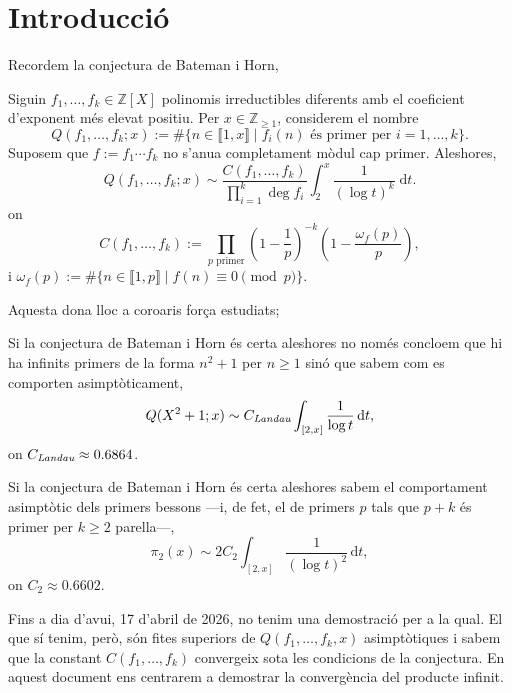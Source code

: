 \section{Introducció}

Recordem la conjectura de Bateman i Horn,
\begin{cnj}
Siguin $f_1,\ldots, f_k\in\mathbb Z[X]$ polinomis irreductibles diferents amb el coeficient d'exponent més elevat positiu. Per $x\in \mathbb Z_{\geq1}$, considerem el nombre
\[
Q(f_1,\ldots,f_k; x):=\#\{n\in \llbracket1,x\rrbracket \mid f_i(n)\text{ és primer per } i=1,\ldots,k\}.
\]
Suposem que $f:=f_1\cdots f_k$ no s'anu\lgem a completament mòdul cap primer. Aleshores,
\[
Q(f_1,\ldots,f_k;x)\sim \frac{C(f_1,\ldots, f_k)}{\prod_{i=1}^k\deg f_i}\int_2^x\frac{1}{(\log t)^k}\;\mathrm{d}t.
\]
on 
\[
C(f_1,\ldots, f_k):=\prod_{p\text{ primer}} \left(1-\frac{1}{p}\right)^{-k}\left(1-\frac{\omega_f(p)}{p}\right),
\]
i $\omega_f(p):=\#\{n\in \llbracket 1, p\rrbracket \mid f(n)\equiv 0 \pmod{p}\}$.
\end{cnj}

Aquesta dona lloc a coro\lgem aris força estudiats;
\begin{coro}
    Si la conjectura de Bateman i Horn és certa aleshores no només concloem que hi ha infinits primers de la forma $n^2+1$ per $n\geq 1$ sinó que sabem com es comporten asimptòticament,
    \[
    Q(X^2+1; x)\sim C_{\emph{\text{Landau}}}\int_{[2,x]}\frac{1}{\log t}\,\mathrm{d}t,
    \]
    on $C_{\emph{\text{Landau}}}\approx 0.6864$.
\end{coro}
\begin{coro}
    Si la conjectura de Bateman i Horn és certa aleshores sabem el comportament asimptòtic dels primers bessons ---i, de fet, el de primers $p$ tals que $p+k$ és primer per $k\geq 2$ parella---,
    \[
    \pi_2(x)\sim 2C_2\int_{[2,x]}\frac{1}{(\log t)^2}\,\mathrm{d}t,
    \]
    on $C_2\approx 0.6602$.
\end{coro}

Fins a dia d'avui, 17 d'abril de 2026, no tenim una demostració per a la qual. El que sí tenim, però, són fites superiors de $Q(f_1,\ldots, f_k,x)$ asimptòtiques i sabem que la constant $C(f_1,\ldots, f_k)$ convergeix sota les condicions de la conjectura. En aquest document ens centrarem a demostrar la convergència del producte infinit. 